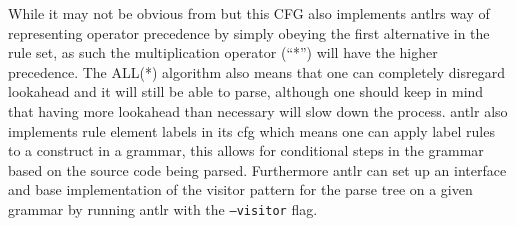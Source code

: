 While it may not be obvious from  but this CFG also implements \acrshort{antlr}s way of representing operator precedence by simply obeying the first alternative in the rule set, as such the multiplication operator (``*'') will have the higher precedence.
The ALL(*) algorithm also means that one can completely disregard lookahead and it will still be able to parse, although one should keep in mind that having more lookahead than necessary will slow down the process. %
\acrshort{antlr} also implements rule element labels in its \acrfull{cfg} which means one can apply label rules to a construct in a grammar, this allows for conditional steps in the grammar based on the source code being parsed.
Furthermore \acrshort{antlr} can set up an interface and base implementation of the visitor pattern for the parse tree on a given grammar by running \acrshort{antlr} with the \texttt{--visitor} flag.\citep{ALLSTAR, LLSTAR, antlr4_Book}



